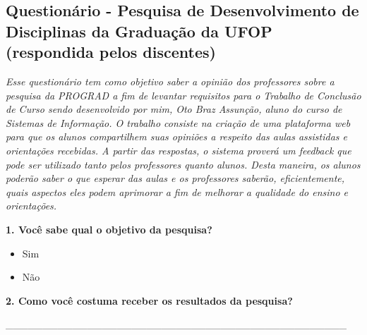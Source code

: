 \documentclass[
  12pt,       %
  openright,      %
  oneside,      %
  a4paper,      %
  english,      %
  french,        %
  spanish,     %
  brazil        %
  ]{abntex2-decsi}
\begin{document}
%
%


\begin{apendicesenv}

\partapendices

\setlength{\parindent}{0in}

\chapter{Questionário - Pesquisa de Desenvolvimento de Disciplinas da Graduação da UFOP (respondida pelos discentes)}\label{questionario_1}

		\textit{Esse questionário tem como objetivo saber a opinião dos professores sobre a pesquisa da PROGRAD a fim de levantar requisitos para o Trabalho de Conclusão de Curso sendo desenvolvido por mim, Oto Braz Assunção, aluno do curso de Sistemas de Informação. O trabalho consiste na criação de uma plataforma web para que os alunos compartilhem suas opiniões a respeito das aulas assistidas e orientações recebidas. A partir das respostas, o sistema proverá um feedback que pode ser utilizado tanto pelos professores quanto alunos. Desta maneira, os alunos poderão saber o que esperar das aulas e os professores saberão, eficientemente, quais aspectos eles podem aprimorar a fim de melhorar a qualidade do ensino e orientações.}
        
        \textbf{1. Você sabe qual o objetivo da pesquisa?}
        	
            \begin{itemize}[label=\Circle]             
            \item Sim
            \item Não                   
            \end{itemize}
        
        \textbf{2. Como você costuma receber os resultados da pesquisa?}
        
        \_\_\_\_\_\_\_\_\_\_\_\_\_\_\_\_\_\_\_\_\_\_\_\_\_\_\_\_\_\_\_\_\_\_\_\_\_\_\_\_\_\_\_\_\_\_\\
        

\end{apendicesenv}
\end{document}
